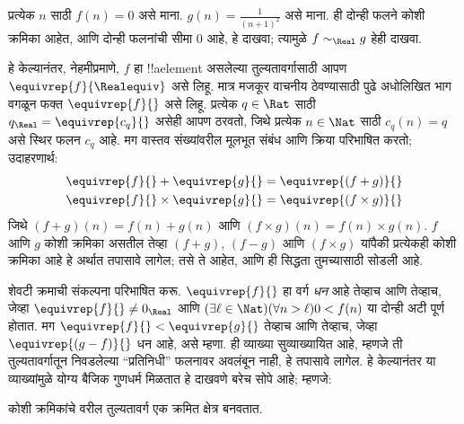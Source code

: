 \documentclass[../../../include/open-logic-section]{subfiles}
\begin{document}
\begin{prob}
प्रत्येक $n$ साठी $f(n) = 0$ असे माना. $g(n) =
\frac{1}{(n+1)^2}$ असे माना. ही दोन्ही फलने कोशी क्रमिका आहेत, आणि
दोन्ही फलनांची सीमा $0$ आहे, हे दाखवा; त्यामुळे $f \sim_\Real g$
हेही दाखवा.
\end{prob}

हे केल्यानंतर, नेहमीप्रमाणे, $f$ हा !!a{element} असलेल्या तुल्यतावर्गासाठी
आपण $\equivrep{f}{\Realequiv}$ असे लिहू. मात्र मजकूर वाचनीय ठेवण्यासाठी
पुढे अधोलिखित भाग वगळून फक्त $\equivrep{f}{}$ असे लिहू. प्रत्येक $q
\in \Rat$ साठी $q_{\Real} = \equivrep{c_{q}}{}$ असेही आपण ठरवतो,
जिथे प्रत्येक $n \in \Nat$ साठी $c_q(n) = q$ असे स्थिर फलन $c_{q}$
आहे. मग वास्तव संख्यांवरील मूलभूत संबंध आणि क्रिया परिभाषित करतो;
उदाहरणार्थ:
\begin{align*}
	\equivrep{f}{} + \equivrep{g}{} &= 	\equivrep{(f + g)}{} \\
	\equivrep{f}{} \times 	\equivrep{g}{} &= \equivrep{(f \times g)}{}
\end{align*}
जिथे $(f + g)(n) = f(n) + g(n)$ आणि $(f \times g)(n) = f(n) \times
g(n)$. $f$ आणि $g$ कोशी क्रमिका असतील तेव्हा $(f + g)$, $(f-g)$ आणि
$(f\times g)$ यांपैकी प्रत्येकही कोशी क्रमिका आहे हे अर्थात तपासावे
लागेल; तसे ते आहेत, आणि ही सिद्धता तुमच्यासाठी सोडली आहे.

शेवटी क्रमाची संकल्पना परिभाषित करू. $\equivrep{f}{}$ हा वर्ग
\emph{धन} आहे तेव्हाच आणि तेव्हाच, जेव्हा $\equivrep{f}{}\neq 0_\Real$
आणि $(\exists \ell \in \Nat)(\forall n > \ell)0 < f(n)$
या दोन्ही अटी पूर्ण होतात. मग $\equivrep{f}{} <
\equivrep{g}{}$ तेव्हाच आणि तेव्हाच, जेव्हा $\equivrep{(g - f)}{}$
धन आहे, असे म्हणा.
ही व्याख्या सुव्याख्यायित आहे, म्हणजे ती तुल्यतावर्गातून निवडलेल्या
“प्रतिनिधी” फलनावर अवलंबून नाही, हे तपासावे लागेल.
हे केल्यानंतर या व्याख्यांमुळे योग्य बैजिक गुणधर्म मिळतात हे दाखवणे
बरेच सोपे आहे; म्हणजे:
\begin{thm}
कोशी क्रमिकांचे वरील तुल्यतावर्ग एक क्रमित क्षेत्र बनवतात.
\end{thm}
\end{document}
